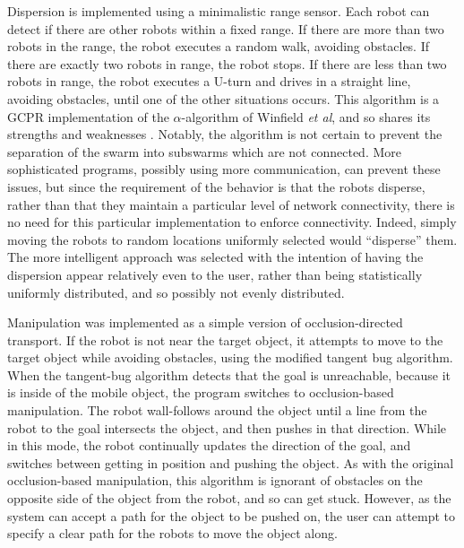 Dispersion is implemented using a minimalistic range sensor. 
Each robot can detect if there are other robots within a fixed range. 
If there are more than two robots in the range, the robot executes a random walk, avoiding obstacles. 
If there are exactly two robots in range, the robot stops. If there are less than two robots in range, the robot executes a U-turn and drives in a straight line, avoiding obstacles, until one of the other situations occurs. 
This algorithm is a GCPR implementation of the $\alpha$-algorithm of Winfield \emph{et al}, and so shares its strengths and weaknesses  \cite{winfield2008modelling}.
Notably, the algorithm is not certain to prevent the separation of the swarm into subswarms which are not connected. 
More sophisticated programs, possibly using more communication, can prevent these issues, but since the requirement of the behavior is that the robots disperse, rather than that they maintain a particular level of network connectivity, there is no need for this particular implementation to enforce connectivity. 
Indeed, simply moving the robots to random locations uniformly selected would ``disperse'' them. 
The more intelligent approach was selected with the intention of having the dispersion appear relatively even to the user, rather than being statistically uniformly distributed, and so possibly not evenly distributed. 

Manipulation was implemented as a simple version of occlusion-directed transport. 
If the robot is not near the target object, it attempts to move to the target object while avoiding obstacles, using the modified tangent bug algorithm. 
When the tangent-bug algorithm detects that the goal is unreachable, because it is inside of the mobile object, the program switches to occlusion-based manipulation. 
The robot wall-follows around the object until a line from the robot to the goal intersects the object, and then pushes in that direction. 
While in this mode, the robot continually updates the direction of the goal, and switches between getting in position and pushing the object. 
As with the original occlusion-based manipulation, this algorithm is ignorant of obstacles on the opposite side of the object from the robot, and so can get stuck. 
However, as the system can accept a path for the object to be pushed on, the user can attempt to specify a clear path for the robots to move the object along. 

